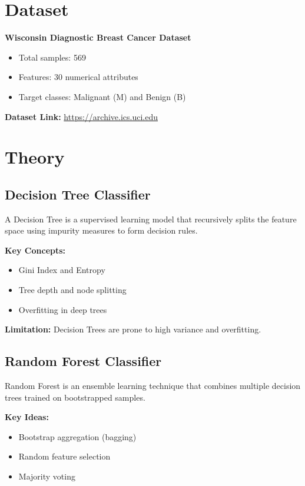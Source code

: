 \documentclass[11pt]{article}
\begin{document}

\section*{Dataset}
\textbf{Wisconsin Diagnostic Breast Cancer Dataset}

\begin{itemize}
    \item Total samples: 569
    \item Features: 30 numerical attributes
    \item Target classes: Malignant (M) and Benign (B)
\end{itemize}

\textbf{Dataset Link:}  
\href{https://archive.ics.uci.edu/dataset/17/breast+cancer+wisconsin+diagnostic}{https://archive.ics.uci.edu}


\section*{Theory}

\subsection*{Decision Tree Classifier}
A Decision Tree is a supervised learning model that recursively splits the feature space using impurity measures to form decision rules.

\textbf{Key Concepts:}
\begin{itemize}
    \item Gini Index and Entropy
    \item Tree depth and node splitting
    \item Overfitting in deep trees
\end{itemize}

\textbf{Limitation:}  
Decision Trees are prone to high variance and overfitting.

\subsection*{Random Forest Classifier}
Random Forest is an ensemble learning technique that combines multiple decision trees trained on bootstrapped samples.

\textbf{Key Ideas:}
\begin{itemize}
    \item Bootstrap aggregation (bagging)
    \item Random feature selection
    \item Majority voting
\end{itemize}
\end{document}
